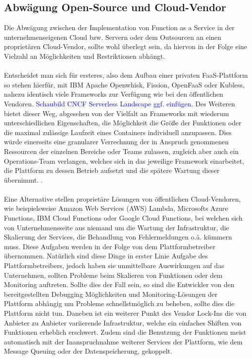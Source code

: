 \documentclass[11pt]{article}
\begin{document}
\subsection{Abwägung Open-Source und Cloud-Vendor}
Die Abwägung zwischen der Implementation von Function as a Service in der unternehmenseigenen Cloud bzw. Servern oder dem Outsourcen an einen proprietären Cloud-Vendor, sollte wohl überlegt sein, da hiervon in der Folge eine Vielzahl an Möglichkeiten und Restriktionen abhängt. \\\\
Entscheidet man sich für ersteres, also dem Aufbau einer privaten FaaS-Plattform so stehen hierfür, mit IBM Apache Openwhisk, Fission, OpenFaaS oder Kubless, nahezu identisch viele Frameworks zur Verfügung wie bei den öffentlichen Vendoren. \textcolor{blue}{Schaubild CNCF Serverless Landscape ggf. einfügen.} Des Weiteren bietet dieser Weg, abgesehen von der Vielfalt an Frameworks mit wiederum unterschiedlichen Eigenschaften, die Möglichkeit die Größe der Funktionen oder die maximal zulässige Laufzeit eines Containers individuell anzupassen. Dies würde einerseits eine granularer Verrechnung der in Anspruch genommenen Ressourcen der einzelnen Bereiche oder Teams zulassen, zugleich aber auch ein Operations-Team verlangen, welches sich in das jeweilige Framework einarbeitet, die Plattform zu dessen Betrieb aufsetzt und die spätere Wartung dieser übernimmt. \cite{mohanty2018evaluation}.\\\\
Eine Alternative stellen proprietäre Lösungen von öffentlichen Cloud-Vendoren, wie beispielsweise Amazon Web Services (AWS) Lambda, Microsofts Azure Functions, IBM Cloud Functions oder Google Cloud Functions, bei welchen sich von Unternehmensseite aus niemand um die Wartung der Infrastruktur, die Skalierung der Services, die Behandlung von Fehlermeldungen o.ä. kümmern muss. Diese Aufgaben werden in der Folge von dem Plattformbetreiber übernommen. Natürlich sind diese Dinge in erster Linie Aufgabe des Plattformbetreibers, jedoch haben sie unmittelbare Auswirkungen auf das Unternehmen, sollten Probleme beim Skalieren von Funktionen oder dem Monitoring auftreten. Sollte dies der Fall sein, so sind die Entwickler von den bereitgestellten Debugging Möglichkeiten und Monitoring-Lösungen der Plattform abhängig um Probleme schnellstmöglich zu beheben, sollte dies die Plattform nicht tun. Daneben ist ein weiterer Punkt des Vendor Lock-Ins die von Anbieter zu Anbieter variierende Infrastruktur, welche ein einfaches Shiften von Funktionen erheblich erschwert. Zudem sind die Benutzung der Funktionen meist automatisch mit der Inanspruchnahme weiterer Services der Plattform, wie dem Message Queuing oder der Datenspeicherung, gekoppelt. \\\\
\end{document}
